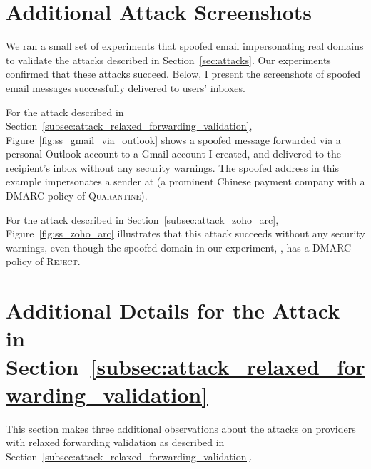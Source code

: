

\section{Additional Attack Screenshots}
We ran a small set of experiments that spoofed email impersonating real domains to validate the attacks described in Section~\ref{sec:attacks}.
Our experiments confirmed that these attacks succeed.
Below, I present the screenshots of spoofed email messages successfully delivered to users' inboxes.

For the attack described in Section~\ref{subsec:attack_relaxed_forwarding_validation}, Figure~\ref{fig:ss_gmail_via_outlook} shows a spoofed message forwarded via a personal Outlook account to a Gmail account I created, and delivered to the recipient's inbox without any security warnings.
The spoofed address in this example impersonates a sender at  (a prominent Chinese payment company with a DMARC policy of \textsc{Quarantine}).

For the attack described in Section~\ref{subsec:attack_zoho_arc}, Figure~\ref{fig:ss_zoho_arc} illustrates that this attack succeeds
without any security warnings, even though the spoofed domain in our
experiment, , has a DMARC policy of \textsc{Reject}.


\section{Additional Details for the Attack in Section~\ref{subsec:attack_relaxed_forwarding_validation}}
\label{sec:append_change_behavior_details}
This section makes three additional observations about the attacks on
providers with relaxed forwarding validation as described in
Section~\ref{subsec:attack_relaxed_forwarding_validation}.

